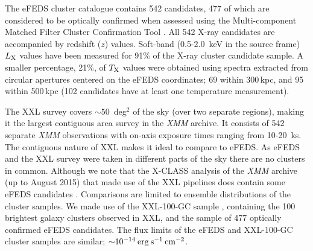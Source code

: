 \documentclass[fleqn,usenatbib]{mnras}
\begin{document}
The eFEDS cluster catalogue \citep{efedsclustercat} contains 542 candidates, 477 of which are considered to be optically confirmed \citep{efedsclusteropticalcat} when assessed using the Multi-component Matched Filter Cluster Confirmation Tool \citep[MCMF, ][]{MCMF}. All 542 X-ray candidates are accompanied by redshift ($z$) values. Soft-band (0.5-2.0~keV in the source frame) $L_{\rm X}$ values have been measured for 91\% of the X-ray cluster candidate sample. A smaller percentage, 21\%, of $T_{\rm X}$ values were obtained using spectra extracted from circular apertures centered on the eFEDS coordinates; 69 within 300\,kpc, and 95 within 500\,kpc (102 candidates have at least one temperature measurement).

The XXL survey \citep{xxlfoundation} covers ${\sim}50$~deg$^2$ of the sky (over two separate regions), making it the largest contiguous area survey in the {\em XMM} archive. It consists of 542 separate {\em XMM} observations with on-axis exposure times ranging from 10-20~ks. The contiguous nature of XXL makes it ideal to compare to eFEDS. As eFEDS and the XXL survey were taken in different parts of the sky there are no clusters in common. Although we note that the X-CLASS analysis of the {\em XMM} archive (up to August 2015) that made use of the XXL pipelines does contain some eFEDS candidates \citep[][]{xclass}. Comparisons are limited to ensemble distributions of the cluster samples.  We made use of the XXL-100-GC sample \citep{xxlgc100}, containing the 100 brightest galaxy clusters observed in XXL, and the sample of 477 optically confirmed eFEDS candidates.  The flux limits of the eFEDS and XXL-100-GC cluster samples are similar; ${\sim}10^{-14}\:\rm{erg}\:\rm{s}^{-1}\:\rm{cm}^{-2}$.

\end{document}
